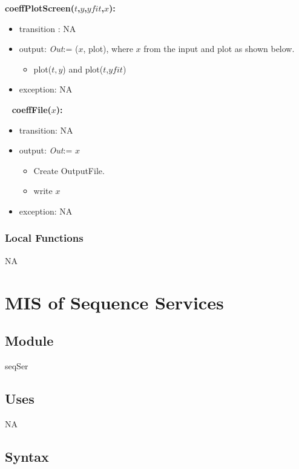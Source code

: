 \documentclass[12pt, titlepage]{article}
\begin{document}
\noindent \textbf{coeffPlotScreen($t$,$y$,$yfit$,$x$):}
\begin{itemize}
	\item transition : NA

	\item output: \textit{Out}:= ($x$, plot), where $x$ from the input and plot 
	as shown below.
		\begin{itemize}
		\item plot($t,y$) and plot($t$,$yfit$)
		\end{itemize}	 
	\item exception: NA
\end{itemize}


~\newline
\noindent \textbf{coeffFile($x$):}
\begin{itemize}
	\item transition: NA
	\item output: \textit{Out}:= $x$
	\begin{itemize}	
		\item Create OutputFile. 
		\item write $x$
	\end{itemize}
	\item exception: NA 
\end{itemize}

\subsubsection{Local Functions}

NA




\section{MIS of Sequence Services} \label{seqSer} 

\subsection{Module}

seqSer 

\subsection{Uses} 
NA
\subsection{Syntax}
\end{document}
